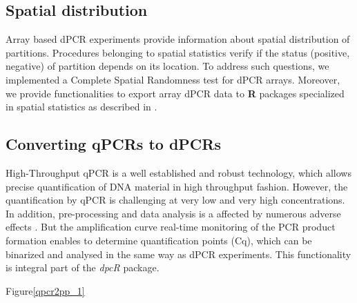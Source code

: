 \documentclass[a4,center,fleqn]{NAR}
\begin{document}
\subsection{Spatial distribution}

Array based dPCR experiments provide information about spatial distribution of 
partitions. Procedures belonging to spatial statistics verify if the status 
(positive, negative) of partition depends on its location. To address such 
questions, we implemented a Complete Spatial Randomness test for dPCR arrays. 
Moreover, we provide functionalities to export array dPCR data to \textbf{R} 
packages specialized in spatial statistics as described in 
\cite{Baddeley_Turner_2005}.

\subsection{Converting qPCRs to dPCRs}

High-Throughput qPCR is a well established and robust technology, which allows 
precise quantification of DNA material in high throughput fashion. However, the 
quantification by qPCR is challenging at very low and very high concentrations. 
In addition, pre-processing and data analysis is a affected by numerous adverse 
effects \cite{ruijter_2013, pabinger_survey_2014, spiess_impact_2015}. But the 
amplification curve real-time monitoring of the PCR product formation enables to 
determine quantification points (Cq), which can be binarized and analysed in the 
same way as dPCR experiments. This functionality is integral part of the 
\textit{dpcR} package.

Figure\ref{qpcr2pp_1}
\end{document}

